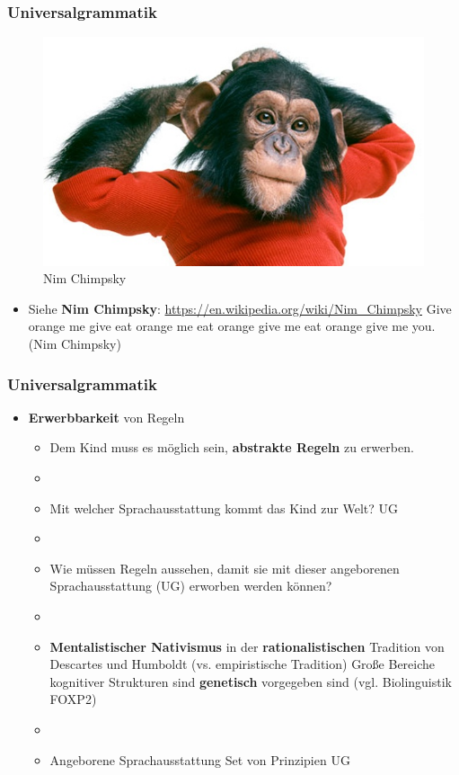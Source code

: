 \begin{frame}
\frametitle{Universalgrammatik}

\begin{figure}
\centering
	\includegraphics[scale=.3]{material/06nimchimpsky}
	\caption{Nim Chimpsky}
\end{figure}

\begin{itemize}
	\item Siehe \textbf{Nim Chimpsky}: \url{https://en.wikipedia.org/wiki/Nim_Chimpsky}
	\ea Give orange me give eat orange me eat orange give me eat orange give me you. \hfill (Nim Chimpsky)
	\z

\end{itemize}

\end{frame}


\begin{frame}
\frametitle{Universalgrammatik}

\begin{itemize}
	\item \textbf{Erwerbbarkeit} von Regeln 
	\begin{itemize}
		\item Dem Kind muss es möglich sein, \textbf{abstrakte Regeln} zu erwerben.
		\item[]
		\item Mit welcher Sprachausstattung kommt das Kind zur Welt? \ras UG
		\item[]
		\item Wie müssen Regeln aussehen, damit sie mit dieser angeborenen Sprachausstattung (UG) erworben werden können?
		\item[]
		\item \textbf{Mentalistischer Nativismus} in der \textbf{rationalistischen} Tradition von Descartes und Humboldt (vs. empiristische Tradition) \ras Große Bereiche kognitiver Strukturen sind \textbf{genetisch} vorgegeben sind (vgl. Biolinguistik \ras FOXP2) \citep[vgl.][]{Hornstein05a}
		\item[]
		\item Angeborene Sprachausstattung \ras Set von Prinzipien \ras UG		
	\end{itemize}
\end{itemize}

\end{frame}


